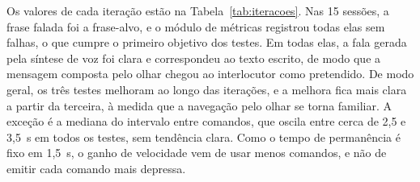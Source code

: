 Os valores de cada iteração estão na Tabela~\ref{tab:iteracoes}. Nas 15 sessões, a frase falada foi a frase-alvo, e o módulo de métricas registrou todas elas sem falhas, o que cumpre o primeiro objetivo dos testes. Em todas elas, a fala gerada pela síntese de voz foi clara e correspondeu ao texto escrito, de modo que a mensagem composta pelo olhar chegou ao interlocutor como pretendido. De modo geral, os três testes melhoram ao longo das iterações, e a melhora fica mais clara a partir da terceira, à medida que a navegação pelo olhar se torna familiar. A exceção é a mediana do intervalo entre comandos, que oscila entre cerca de 2,5 e 3,5~s em todos os testes, sem tendência clara. Como o tempo de permanência é fixo em 1,5~s, o ganho de velocidade vem de usar menos comandos, e não de emitir cada comando mais depressa.

